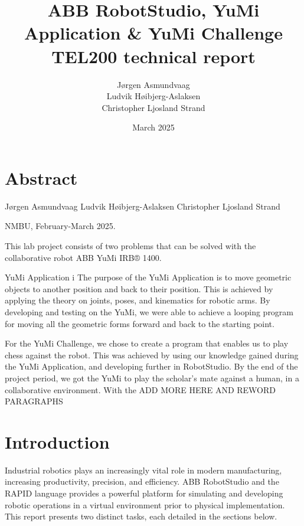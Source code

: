 \documentclass[a4paper,12pt]{article}
\begin{document}
\begin{titlepage}
    \centering
    \vfill
    
    \title{ABB RobotStudio, YuMi Application \& YuMi Challenge \\ \large TEL200 technical report\vspace{10cm}}
    \author{J\o rgen Asmundvaag \\ Ludvik H\o ibjerg-Aslaksen \\ Christopher Ljosland Strand}
    \date{March 2025}
    \maketitle
    \vfill
    \begin{figure}
        
    \end{figure}
    \vfill
\end{titlepage}

\section{Abstract}
Jørgen Asmundvaag
Ludvik Høibjerg-Aslaksen
Christopher Ljosland Strand

NMBU, February-March 2025.

This lab project consists of two problems that can be solved with the collaborative robot ABB YuMi IRB® 1400. 

YuMi Application i
The purpose of the YuMi Application is to move geometric objects to another position and back to their position. This is achieved by applying the theory on joints, poses, and kinematics for robotic arms. By developing and testing on the YuMi, we were able to achieve a looping program for moving all the geometric forms forward and back to the starting point. 

For the YuMi Challenge, we chose to create a program that enables us to play chess against the robot. This was achieved by using our knowledge gained during the YuMi Application, and developing further in RobotStudio. By the end of the project period, we got the YuMi to play the scholar's mate against a human, in a collaborative environment. With the ADD MORE HERE AND REWORD PARAGRAPHS


\newpage
\tableofcontents
\newpage

\section{Introduction}
Industrial robotics plays an increasingly vital role in modern manufacturing, increasing productivity, precision, and efficiency. ABB RobotStudio and the RAPID language provides a powerful platform for simulating and developing robotic operations in a virtual environment prior to physical implementation. This report presents two distinct tasks, each detailed in the sections below.
\end{document}
